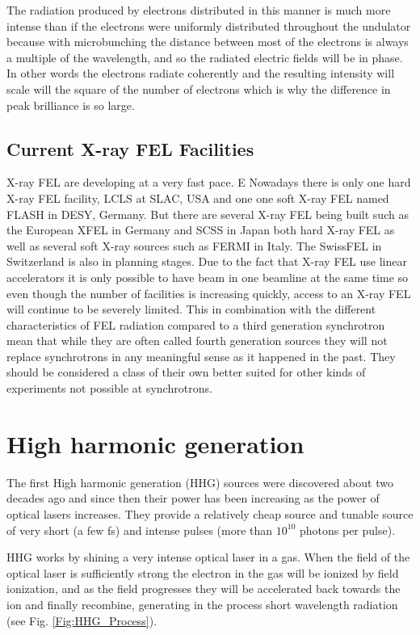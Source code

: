 The radiation produced by electrons distributed in this manner is much more
intense than if the electrons were uniformly distributed throughout the
undulator because with microbunching the distance between most of the electrons is
always a multiple of the wavelength, and so the radiated electric fields will be
in phase. In other words the electrons radiate coherently and the resulting
intensity will scale will the square of the number of electrons which is why the
difference in peak brilliance is so large.

\subsection{Current X-ray FEL Facilities}

X-ray FEL are developing at a very fast pace. E
Nowadays there is only one hard X-ray FEL facility, LCLS at SLAC, USA and one
one soft X-ray FEL named FLASH in DESY, Germany. But there are several X-ray FEL
being built such as the European XFEL in Germany and SCSS
in Japan both hard X-ray FEL as well as several soft X-ray sources such as FERMI
in Italy. The SwissFEL in Switzerland is also in planning stages. 
Due to the fact that X-ray FEL use linear accelerators it is only
possible to have beam in one beamline at the same time so even though the number
of facilities is increasing quickly, access to an X-ray FEL will continue to be
severely limited. This in combination with the different characteristics of FEL
radiation compared to a third generation synchrotron mean that while they are
often called fourth generation sources they will not replace synchrotrons in any
meaningful sense as it happened in the past. They should be considered a class of
their own better suited for other kinds of experiments not possible at synchrotrons.

\section{High harmonic generation}

The first High harmonic generation (HHG) sources were discovered about two decades ago
and since then their power has been increasing as the power of optical lasers
increases. They provide a relatively cheap source and tunable source of very
short (a few fs) and intense pulses (more than $10^{10}$ photons per pulse). 

HHG works by shining a very intense optical laser in a gas. When the field of
the optical laser is sufficiently strong the electron in the gas will be ionized
by field ionization, and as the field progresses they will be accelerated back
towards the ion and finally recombine, generating in the process short
wavelength radiation (see Fig. \ref{Fig:HHG_Process}).

